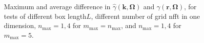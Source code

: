 \begin{figure}[H]
\begin{centering}
\par\end{centering}
\begin{centering}
\par\end{centering}
\caption[Maximum and average difference in $\hat{\gamma}(\mathbf{k},\mathbf{\Omega})$
and $\gamma(\mathbf{r},\mathbf{\Omega})$]{Maximum and average difference in $\hat{\gamma}(\mathbf{k},\mathbf{\Omega})$
and $\gamma(\mathbf{r},\mathbf{\Omega})$, for tests of different
box length$L$, different number of grid nfft in one dimension, $n_{\max}=1,4$
for $m_{\max}=n_{\max}$, and $n_{\max}=1,4$ for $m_{\max}=5$.\label{fig:Difference-in-gamma}}
\end{figure}

